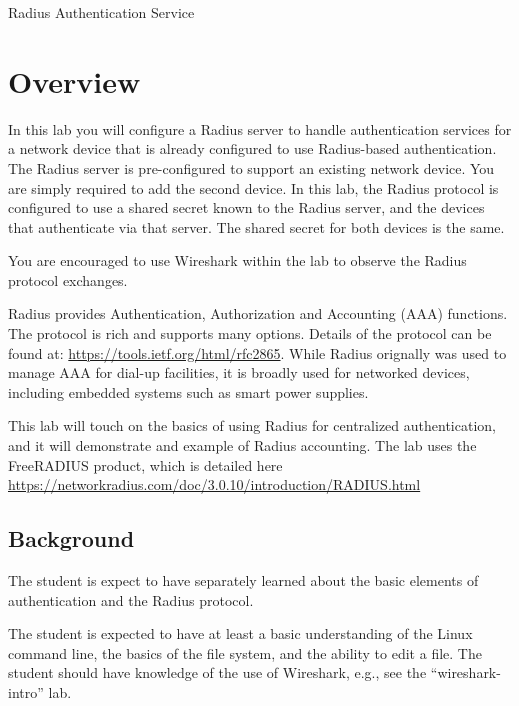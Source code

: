 


\begin{center}
{\LARGE Radius Authentication Service}
\vspace{0.1in}\\
\end{center}

\copyrightnotice

\section{Overview}
In this lab you will configure a Radius server to handle authentication
services for a network device that is already configured to use Radius-based
authentication.  The Radius server is pre-configured to support an existing
network device.  You are simply required to add the second device.
In this lab, the Radius protocol is configured to use a shared secret known
to the Radius server, and the devices that authenticate via that server.
The shared secret for both devices is the same.

You are encouraged to use Wireshark within the lab to observe the Radius
protocol exchanges.

Radius provides Authentication, Authorization and Accounting (AAA) functions.  The protocol is rich and 
supports many options.  Details of the protocol can be found at: \url{https://tools.ietf.org/html/rfc2865}.
While Radius orignally was used to manage AAA for dial-up facilities, it is broadly used for networked devices,
including embedded systems such as smart power supplies.

This lab will touch on the basics of using Radius for centralized authentication, and it will demonstrate
and example of Radius accounting. The lab uses the
FreeRADIUS product, which is detailed here \url{https://networkradius.com/doc/3.0.10/introduction/RADIUS.html}

\subsection {Background}
The student is expect to have separately learned about the basic elements of authentication
and the Radius protocol.

The student is expected to have at least a basic understanding of the Linux command line,
the basics of the file system, and the ability to edit a file.  The student should have
knowledge of the use of Wireshark, e.g., see the ``wireshark-intro'' lab.

